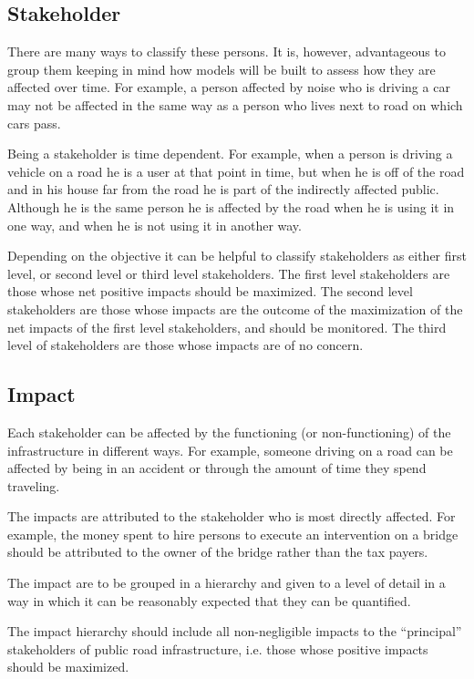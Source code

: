 \subsection{Stakeholder}
There are many ways to classify these persons. It is, however, advantageous to group them keeping in mind how models will be built to assess how they are affected over time. For example, a person affected by noise who is driving a car may not be affected in the same way as a person who lives next to road on which cars pass.

Being a stakeholder is time dependent. For example, when a person is driving a vehicle on a road he is a user at that point in time, but when he is off of the road and in his house far from the road he is part of the indirectly affected public. Although he is the same person he is affected by the road when he is using it in one way, and when he is not using it in another way.

Depending on the objective it can be helpful to classify stakeholders as either first level, or second level or third level stakeholders. The first level stakeholders are those whose net positive impacts should be maximized. The second level stakeholders are those whose impacts are the outcome of the maximization of the net impacts of the first level stakeholders, and should be monitored.  The third level of stakeholders are those whose impacts are of no concern.
%
\subsection{Impact}
Each stakeholder can be affected by the functioning (or non-functioning) of the infrastructure in different ways. For example, someone driving on a road can be affected by being in an accident or through the amount of time they spend traveling. 

The impacts are attributed to the stakeholder who is most directly affected. For example, the money spent to hire persons to execute an intervention on a bridge should be attributed to the owner of the bridge rather than the tax payers.

The impact are to be grouped in a hierarchy and given to a level of detail in a way in which it can be reasonably expected that they can be quantified. 

The impact hierarchy should include all non-negligible impacts to the “principal” stakeholders of public road infrastructure, i.e. those whose positive impacts should be maximized. 

